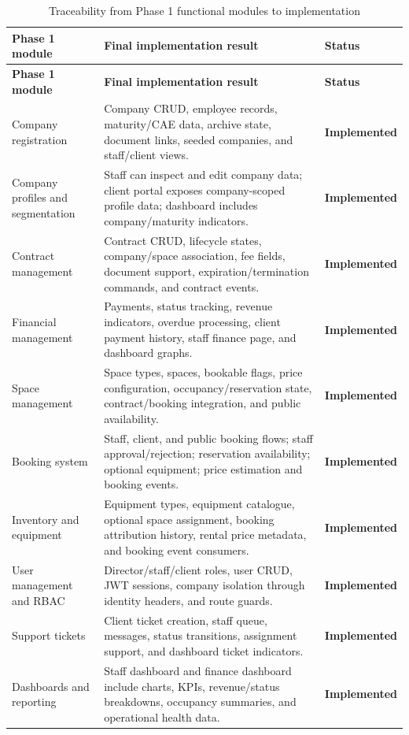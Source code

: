 \documentclass[12pt,a4paper]{report}
\newcommand{\implemented}{\textcolor{successgreen}{\textbf{Implemented}}}
\begin{document}
\begin{longtable}{L{0.22\textwidth}L{0.56\textwidth}C{0.13\textwidth}}
\caption{Traceability from Phase 1 functional modules to implementation}\label{tab:functional-traceability}\\
\toprule
\textbf{Phase 1 module} & \textbf{Final implementation result} & \textbf{Status} \\
\midrule
\endfirsthead
\toprule
\textbf{Phase 1 module} & \textbf{Final implementation result} & \textbf{Status} \\
\midrule
\endhead
Company registration & Company CRUD, employee records, maturity/CAE data, archive state, document links, seeded companies, and staff/client views. & \implemented \\
Company profiles and segmentation & Staff can inspect and edit company data; client portal exposes company-scoped profile data; dashboard includes company/maturity indicators. & \implemented \\
Contract management & Contract CRUD, lifecycle states, company/space association, fee fields, document support, expiration/termination commands, and contract events. & \implemented \\
Financial management & Payments, status tracking, revenue indicators, overdue processing, client payment history, staff finance page, and dashboard graphs. & \implemented \\
Space management & Space types, spaces, bookable flags, price configuration, occupancy/reservation state, contract/booking integration, and public availability. & \implemented \\
Booking system & Staff, client, and public booking flows; staff approval/rejection; reservation availability; optional equipment; price estimation and booking events. & \implemented \\
Inventory and equipment & Equipment types, equipment catalogue, optional space assignment, booking attribution history, rental price metadata, and booking event consumers. & \implemented \\
User management and RBAC & Director/staff/client roles, user CRUD, JWT sessions, company isolation through identity headers, and route guards. & \implemented \\
Support tickets & Client ticket creation, staff queue, messages, status transitions, assignment support, and dashboard ticket indicators. & \implemented \\
Dashboards and reporting & Staff dashboard and finance dashboard include charts, KPIs, revenue/status breakdowns, occupancy summaries, and operational health data. & \implemented \\
\bottomrule
\end{longtable}
\end{document}
